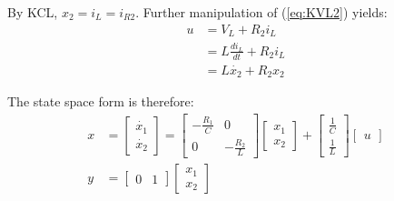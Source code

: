 By KCL, $x_2 = i_{L} = i_{R2}$. Further manipulation of (\ref{eq:KVL2}) yields:
\begin{align}
    u   &= V_{L} + R_{2}i_{L} \\
        &= L \frac{di_{L}}{dt} + R_{2}i_{L} \\
        &= L \dot{x_2} + R_{2}x_2 
\end{align}

The state space form is therefore:
\begin{align}
    x &=
    \begin{bmatrix}
        \dot{x_1} \\
        \dot{x_2}
    \end{bmatrix}
    =
    \begin{bmatrix}
        -\frac{R_{1}}{C} & 0 \\
        0 & -\frac{R_{2}}{L}
    \end{bmatrix}
    \begin{bmatrix}
        x_1 \\
        x_2
    \end{bmatrix}
    +
    \begin{bmatrix}
        \frac{1}{C} \\
        \frac{1}{L} 
    \end{bmatrix}
    \begin{bmatrix}
        u
    \end{bmatrix} \\
    y &= 
    \begin{bmatrix}
        0 & 1
    \end{bmatrix}
    \begin{bmatrix}
        x_1 \\
        x_2
    \end{bmatrix}
\end{align}